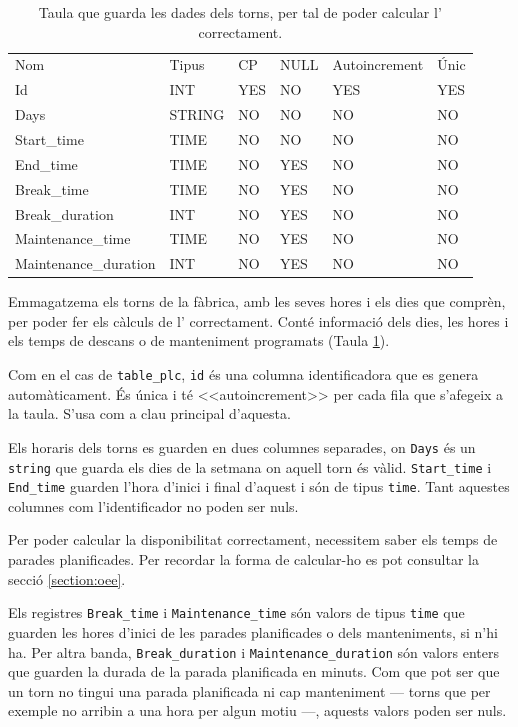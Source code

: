 \documentclass{tfgitic}[2022/06/30]
\begin{document}
\begin{table}[h]
\centering
\label{table:tableShifts}
\begin{tabular}{
>{\columncolor[HTML]{EBEAEA}}llllll}
\cellcolor[HTML]{D3D3D3} Nom & \cellcolor[HTML]{D3D3D3} Tipus & \cellcolor[HTML]{D3D3D3} CP&  \cellcolor[HTML]{D3D3D3} NULL & \cellcolor[HTML]{D3D3D3} Autoincrement & \cellcolor[HTML]{D3D3D3} Únic\\
Id & INT & YES & NO & YES & YES  \\
Days & STRING & NO & NO & NO & NO \\
Start\_time & TIME & NO & NO & NO & NO   \\
End\_time & TIME & NO & YES & NO & NO \\
Break\_time & TIME & NO & YES & NO & NO \\
Break\_duration & INT & NO & YES & NO & NO \\
Maintenance\_time & TIME & NO & YES & NO & NO \\
Maintenance\_duration & INT & NO & YES & NO & NO \\
\end{tabular}
\caption{Taula que guarda les dades dels torns, per tal de poder calcular l' correctament.}
\end{table}

Emmagatzema els torns de la fàbrica, amb les seves hores i els dies que comprèn, per poder fer els càlculs de l' correctament. Conté informació dels dies, les hores i els temps de descans o de manteniment programats (Taula \ref{table:tableShifts}).

Com en el cas de \texttt{table\_plc}, \texttt{id} és una columna identificadora que es genera automàticament. És única i té <<autoincrement>> per cada fila que s'afegeix a la taula. S'usa com a clau principal d'aquesta.

Els horaris dels torns es guarden en dues columnes separades, on \texttt{Days} és un \texttt{string} que guarda els dies de la setmana on aquell torn és vàlid. \texttt{Start\_time} i \texttt{End\_time} guarden l'hora d'inici i final d'aquest i són de tipus \texttt{time}. Tant aquestes columnes com l'identificador no poden ser nuls.

Per poder calcular la disponibilitat correctament, necessitem saber els temps de parades planificades. Per recordar la forma de calcular-ho es pot consultar la secció \ref{section:oee}.

Els registres \texttt{Break\_time} i \texttt{Maintenance\_time} són valors de tipus \texttt{time} que guarden les hores d'inici de les parades planificades o dels manteniments, si n'hi ha. Per altra banda, \texttt{Break\_duration} i \texttt{Maintenance\_duration} són valors enters que guarden la durada de la parada planificada en minuts. Com que pot ser que un torn no tingui una parada planificada ni cap manteniment --- torns que per exemple no arribin a una hora per algun motiu ---, aquests valors poden ser nuls.
\end{document}
